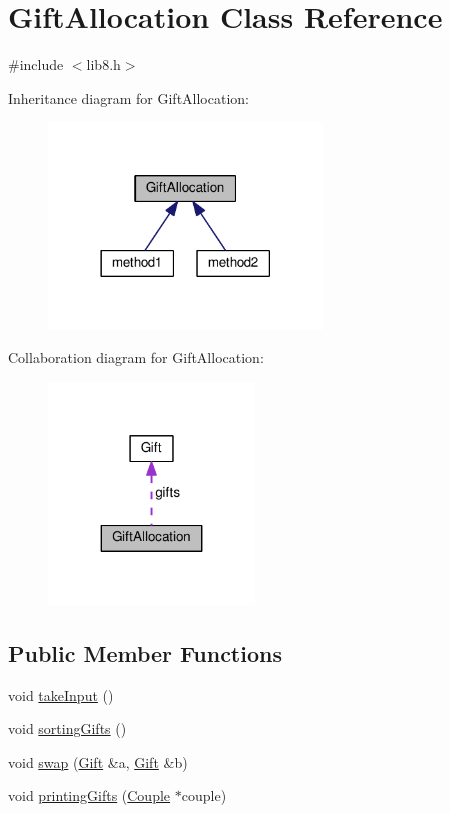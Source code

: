 \hypertarget{classGiftAllocation}{}\section{Gift\+Allocation Class Reference}
\label{classGiftAllocation}


{\ttfamily \#include $<$lib8.\+h$>$}



Inheritance diagram for Gift\+Allocation\+:
\nopagebreak
\begin{figure}[H]
\begin{center}
\leavevmode
\includegraphics[width=206pt]{classGiftAllocation__inherit__graph}
\end{center}
\end{figure}


Collaboration diagram for Gift\+Allocation\+:
\nopagebreak
\begin{figure}[H]
\begin{center}
\leavevmode
\includegraphics[width=155pt]{classGiftAllocation__coll__graph}
\end{center}
\end{figure}
\subsection*{Public Member Functions}
\begin{DoxyCompactItemize}
\item 
void \hyperlink{classGiftAllocation_a251311eacec6f50e78300c576b3938b9}{take\+Input} ()
\item 
void \hyperlink{classGiftAllocation_a54ab23085223d306af9aa3ded70901be}{sorting\+Gifts} ()
\item 
void \hyperlink{classGiftAllocation_ac75f5851dc71925a5c837c0b35a51d26}{swap} (\hyperlink{classGift}{Gift} \&a, \hyperlink{classGift}{Gift} \&b)
\item 
void \hyperlink{classGiftAllocation_a9ea227b1d051645d9aa54d7c4d4d0ce3}{printing\+Gifts} (\hyperlink{classCouple}{Couple} $\ast$couple)
\end{DoxyCompactItemize}
